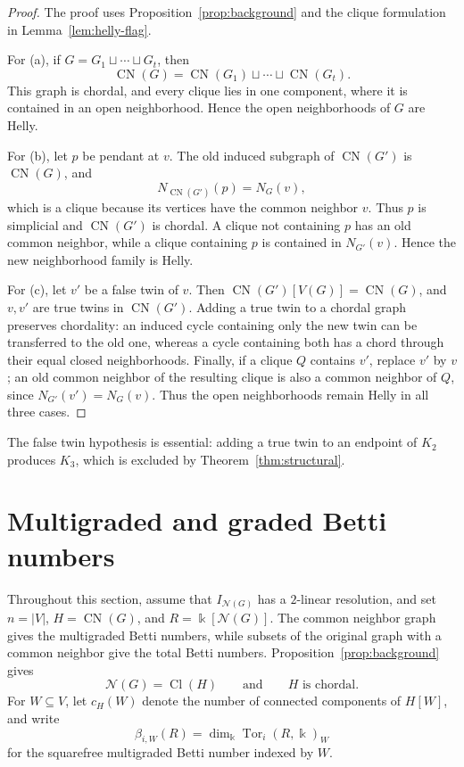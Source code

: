 \documentclass[11pt]{amsart}
\theoremstyle{definition}
\theoremstyle{remark}
\numberwithin{equation}{section}
\newcommand{\NN}{\mathcal N}
\newcommand{\Cl}{\operatorname{Cl}}
\newcommand{\CN}{\operatorname{CN}}
\begin{document}
	\begin{proof}
		The proof uses Proposition~\ref{prop:background} and the clique formulation
		in Lemma~\ref{lem:helly-flag}.

		For \textup{(a)}, if \(G=G_1\sqcup\cdots\sqcup G_t\), then
		\[
		\CN(G)=\CN(G_1)\sqcup\cdots\sqcup\CN(G_t).
		\]
		This graph is chordal, and every clique lies in one component, where it is
		contained in an open neighborhood. Hence the open neighborhoods of \(G\)
		are Helly.

		For \textup{(b)}, let \(p\) be pendant at \(v\). The old induced subgraph
		of \(\CN(G')\) is \(\CN(G)\), and
		\[
		N_{\CN(G')}(p)=N_G(v),
		\]
		which is a clique because its vertices have the common neighbor \(v\).
		Thus \(p\) is simplicial and \(\CN(G')\) is chordal. A clique not
		containing \(p\) has an old common neighbor, while a clique containing
		\(p\) is contained in \(N_{G'}(v)\). Hence the new neighborhood family is
		Helly.

		For \textup{(c)}, let \(v'\) be a false twin of \(v\). Then
		\(\CN(G')[V(G)]=\CN(G)\), and \(v,v'\) are true twins in
		\(\CN(G')\). Adding a true twin to a chordal graph preserves chordality:
		an induced cycle containing only the new twin can be transferred to the old
		one, whereas a cycle containing both has a chord through their equal closed
		neighborhoods. Finally, if a clique \(Q\) contains \(v'\), replace \(v'\)
		by \(v\); an old common neighbor of the resulting clique is also a common
		neighbor of \(Q\), since \(N_{G'}(v')=N_G(v)\). Thus the open
		neighborhoods remain Helly in all three cases.
	\end{proof}
	
	The false twin hypothesis is essential: adding a true twin to an endpoint of
	\(K_2\) produces \(K_3\), which is excluded by
	Theorem~\ref{thm:structural}.
	
	\section{Multigraded and graded Betti numbers}\label{sec:betti}
	
	Throughout this section, assume that \(I_{\NN(G)}\) has a \(2\)-linear
	resolution, and set \(n=|V|\), \(H=\CN(G)\), and
	\(R=\Bbbk[\NN(G)]\). The common neighbor graph gives the multigraded
	Betti numbers, while subsets of the original graph with a common neighbor give
	the total Betti numbers.
	Proposition~\ref{prop:background} gives
	\[
	\NN(G)=\Cl(H)\qquad\text{and}\qquad H\text{ is chordal}.
	\]
	For \(W\subseteq V\), let \(c_H(W)\) denote the number of connected
	components of \(H[W]\), and write
	\[
	\beta_{i,W}(R)
	=
	\dim_{\Bbbk}\operatorname{Tor}_i(R,\Bbbk)_W
	\]
	for the squarefree multigraded Betti number indexed by \(W\).
\end{document}
